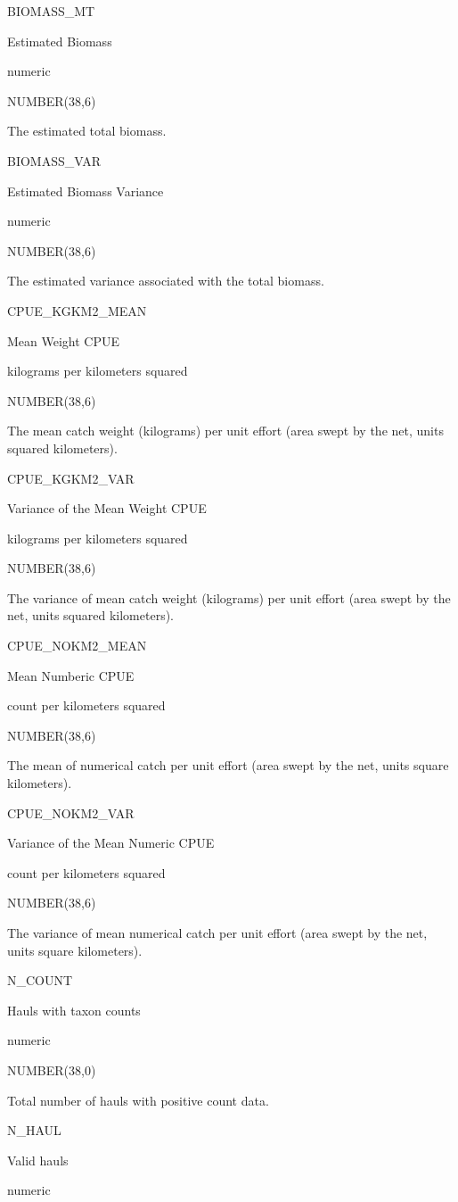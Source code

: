 \documentclass[
  letterpaper,
  oneside,
  open=any]{scrbook}
\begin{document}
BIOMASS\_MT

Estimated Biomass

numeric

NUMBER(38,6)

The estimated total biomass.

BIOMASS\_VAR

Estimated Biomass Variance

numeric

NUMBER(38,6)

The estimated variance associated with the total biomass.

CPUE\_KGKM2\_MEAN

Mean Weight CPUE

kilograms per kilometers squared

NUMBER(38,6)

The mean catch weight (kilograms) per unit effort (area swept by the
net, units squared kilometers).

CPUE\_KGKM2\_VAR

Variance of the Mean Weight CPUE

kilograms per kilometers squared

NUMBER(38,6)

The variance of mean catch weight (kilograms) per unit effort (area
swept by the net, units squared kilometers).

CPUE\_NOKM2\_MEAN

Mean Numberic CPUE

count per kilometers squared

NUMBER(38,6)

The mean of numerical catch per unit effort (area swept by the net,
units square kilometers).

CPUE\_NOKM2\_VAR

Variance of the Mean Numeric CPUE

count per kilometers squared

NUMBER(38,6)

The variance of mean numerical catch per unit effort (area swept by the
net, units square kilometers).

N\_COUNT

Hauls with taxon counts

numeric

NUMBER(38,0)

Total number of hauls with positive count data.

N\_HAUL

Valid hauls

numeric
\end{document}
